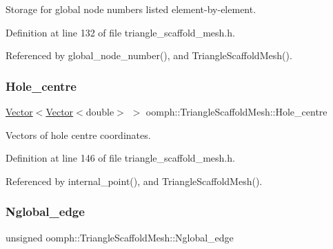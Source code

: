 Storage for global node numbers listed element-\/by-\/element. 



Definition at line 132 of file triangle\+\_\+scaffold\+\_\+mesh.\+h.



Referenced by global\+\_\+node\+\_\+number(), and Triangle\+Scaffold\+Mesh().

\mbox{\label{classoomph_1_1TriangleScaffoldMesh_aedefdb2150daf1062a7c5ac772eecbfd}} 
\subsubsection{\texorpdfstring{Hole\+\_\+centre}{Hole\_centre}}
{\footnotesize\ttfamily \hyperlink{classoomph_1_1Vector}{Vector}$<$\hyperlink{classoomph_1_1Vector}{Vector}$<$double$>$ $>$ oomph\+::\+Triangle\+Scaffold\+Mesh\+::\+Hole\+\_\+centre\hspace{0.3cm}{\ttfamily [protected]}}



Vectors of hole centre coordinates. 



Definition at line 146 of file triangle\+\_\+scaffold\+\_\+mesh.\+h.



Referenced by internal\+\_\+point(), and Triangle\+Scaffold\+Mesh().

\mbox{\label{classoomph_1_1TriangleScaffoldMesh_a5a054950a3e779af9dbe9d062f1c2968}} 
\subsubsection{\texorpdfstring{Nglobal\+\_\+edge}{Nglobal\_edge}}
{\footnotesize\ttfamily unsigned oomph\+::\+Triangle\+Scaffold\+Mesh\+::\+Nglobal\+\_\+edge\hspace{0.3cm}{\ttfamily [protected]}}



